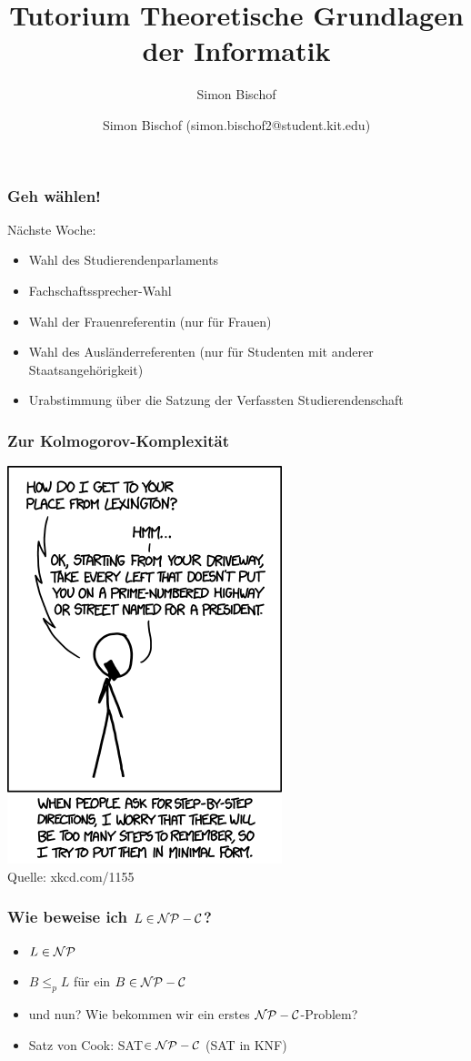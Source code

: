 \documentclass{beamer}
\author{Simon Bischof (simon.bischof2@student.kit.edu)}
\title{Tutorium Theoretische Grundlagen der Informatik}
\subtitle{Simon Bischof}
\institute{Institut f\"{u}r Kryptographie und Sicherheit}
\newcommand{\NP}{\ensuremath \mathcal{NP}}
\newcommand{\NPC}{\ensuremath \mathcal{NP-C}}
\begin{document}
\begin{frame}
\maketitle
\end{frame}

\begin{frame}
\frametitle{\LARGE Geh wählen!}
Nächste Woche:
\begin{itemize}
\item Wahl des Studierendenparlaments
\item Fachschaftssprecher-Wahl
\item Wahl der Frauenreferentin (nur für Frauen)
\item Wahl des Ausländerreferenten (nur für Studenten mit anderer Staatsangehörigkeit)
\item Urabstimmung über die Satzung der Verfassten Studierendenschaft
\end{itemize}
\end{frame}

\begin{frame}
\frametitle{Zur Kolmogorov-Komplexität}
\includegraphics[scale=0.35]{kolmogorov_directions.png}\\
{\tiny Quelle: xkcd.com/1155}
\end{frame}

\begin{frame}
\frametitle{Wie beweise ich $L\in\NPC$?}
\begin{itemize}
\item $L\in\NP$
\item $B\leq_p L$ für ein $B\in\NPC$\pause
\item und nun? Wie bekommen wir ein erstes $\NPC$-Problem?\pause
\item Satz von Cook: SAT$\in\NPC$ (SAT in KNF)
\end{itemize}
\end{frame}
\end{document}
